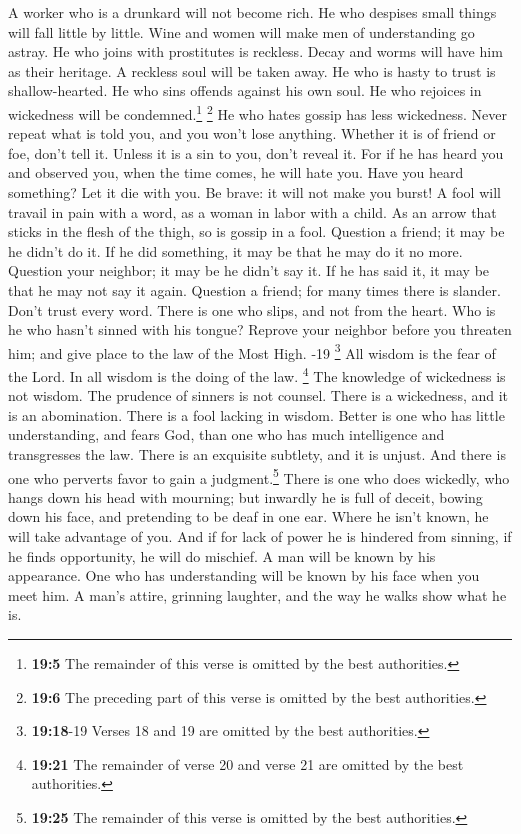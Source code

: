  A worker who is a drunkard will not become rich. He who
despises small things will fall little by little.  Wine
and women will make men of understanding go astray. He who joins with
prostitutes is reckless.  Decay and worms will have him as
their heritage. A reckless soul will be taken away.  He
who is hasty to trust is shallow-hearted. He who sins offends against
his own soul.  He who rejoices in wickedness will be
condemned.\footnote{\textbf{19:5} The remainder of this verse is omitted
  by the best authorities.}  \footnote{\textbf{19:6} The
  preceding part of this verse is omitted by the best authorities.} He
who hates gossip has less wickedness.  Never repeat what
is told you, and you won't lose anything.  Whether it is
of friend or foe, don't tell it. Unless it is a sin to you, don't reveal
it.  For if he has heard you and observed you, when the
time comes, he will hate you.  Have you heard something?
Let it die with you. Be brave: it will not make you burst!
 A fool will travail in pain with a word, as a woman in
labor with a child.  As an arrow that sticks in the flesh
of the thigh, so is gossip in a fool.  Question a friend;
it may be he didn't do it. If he did something, it may be that he may do
it no more.  Question your neighbor; it may be he didn't
say it. If he has said it, it may be that he may not say it again.
 Question a friend; for many times there is slander.
Don't trust every word.  There is one who slips, and not
from the heart. Who is he who hasn't sinned with his tongue?
 Reprove your neighbor before you threaten him; and give
place to the law of the Most High. -19 \footnote{\textbf{19:18}-19
  Verses 18 and 19 are omitted by the best authorities.} 
All wisdom is the fear of the Lord. In all wisdom is the doing of the
law.  \footnote{\textbf{19:21} The remainder of verse 20
  and verse 21 are omitted by the best authorities.}  The
knowledge of wickedness is not wisdom. The prudence of sinners is not
counsel.  There is a wickedness, and it is an
abomination. There is a fool lacking in wisdom.  Better
is one who has little understanding, and fears God, than one who has
much intelligence and transgresses the law.  There is an
exquisite subtlety, and it is unjust. And there is one who perverts
favor to gain a judgment.\footnote{\textbf{19:25} The remainder of this
  verse is omitted by the best authorities.}  There is
one who does wickedly, who hangs down his head with mourning; but
inwardly he is full of deceit,  bowing down his face, and
pretending to be deaf in one ear. Where he isn't known, he will take
advantage of you.  And if for lack of power he is
hindered from sinning, if he finds opportunity, he will do mischief.
 A man will be known by his appearance. One who has
understanding will be known by his face when you meet him.
 A man's attire, grinning laughter, and the way he walks
show what he is.

